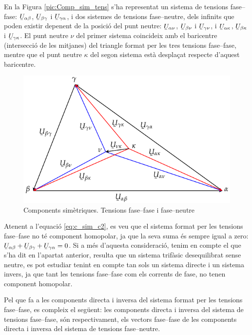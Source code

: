 En la Figura \vref{pic:Comp_sim_tens} s'ha representat un sistema de
tensions fase--fase: $\cmplx{U}_{\alpha\beta}$,
$\cmplx{U}_{\beta\gamma}$ i $\cmplx{U}_{\gamma\alpha}$, i dos
sistemes de tensions fase--neutre, dels infinits que poden existir
depenent de la posici\'{o} del punt neutre: $\cmplx{U}_{\alpha\nu}$,
$\cmplx{U}_{\beta\nu}$ i $\cmplx{U}_{\gamma\nu}$, i
$\cmplx{U}_{\alpha\kappa}$, $\cmplx{U}_{\beta\kappa}$ i
$\cmplx{U}_{\gamma\kappa}$. El punt neutre $\nu$ del primer sistema
coincideix amb el baricentre (intersecci\'{o} de les mitjanes) del
triangle  format per les tres tensions fase--fase, mentre que el
punt neutre $\kappa$ del segon sistema est\`{a} despla\c{c}at respecte
d'aquest baricentre.
\begin{figure}[htb]
\centering
    \includegraphics{Imatges/Cap-CompSim-Tensions.pdf}
\caption{Components sim\`{e}triques. Tensions fase--fase i fase--neutre}
\label{pic:Comp_sim_tens}
\end{figure}

Atenent a l'equaci\'{o} \eqref{eq:c_sim_c2}, es veu que el sistema
format per les tensions fase--fase no t\'{e} component homopolar, ja que
la seva suma  \'{e}s sempre igual a zero: $\cmplx{U}_{\alpha\beta} +
\cmplx{U}_{\beta\gamma} + \cmplx{U}_{\gamma\alpha} = 0$. Si a m\'{e}s
d'aquesta consideraci\'{o}, tenim en compte el que s'ha dit en l'apartat
anterior, resulta que un sistema trif\`{a}sic desequilibrat sense
neutre, es pot estudiar tenint en compte tan sols un sistema directe
i un sistema invers, ja que tant les tensions fase--fase com els
corrents de fase, no tenen component homopolar.

Pel que fa a les components directa i inversa del sistema format per
les tensions fase--fase, es compleix el seg\"{u}ent: les components
directa i inversa del sistema de tensions fase--fase, s\'{o}n
respectivament, els vectors fase--fase de les components directa i
inversa del sistema de tensions fase--neutre.

